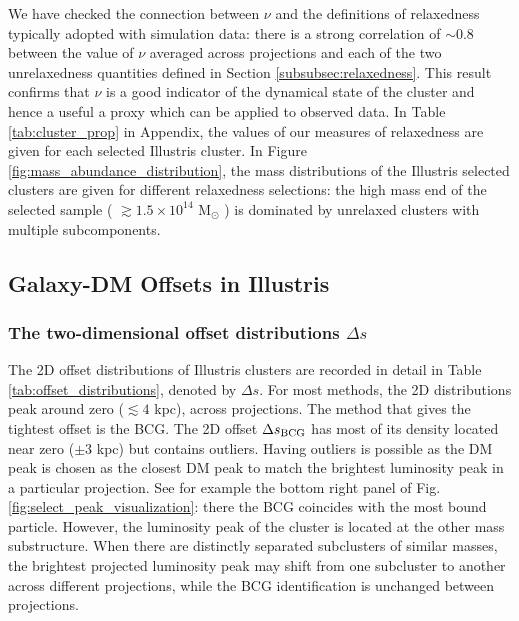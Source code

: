 \documentclass[usenatbib]{mn2e}
\begin{document}
{We have checked the connection between $\nu$ and the definitions of relaxedness typically adopted with simulation data: there is a strong correlation of $\sim 0.8$ between the value of $\nu$ averaged across projections and
each of the two unrelaxedness quantities defined in Section \ref{subsubsec:relaxedness}. This result confirms that $\nu$ is a good indicator of the dynamical state of the cluster and hence a useful a proxy which can be applied to observed data.
In Table \ref{tab:cluster_prop} in Appendix, the values of our measures of relaxedness are given for each selected Illustris cluster. In Figure \ref{fig:mass_abundance_distribution}, the mass distributions of the Illustris selected clusters are given for different relaxedness selections: the high mass end of the selected sample ( $ \gtrsim 1.5 \times 10^{14}$ M$_\odot$ ) is dominated by unrelaxed clusters with multiple subcomponents.



\subsection{Galaxy-DM Offsets in Illustris}
\label{subsec:galaxyDMoffset}

\subsubsection{The two-dimensional offset distributions $\Delta s$}

The 2D offset distributions of Illustris clusters are recorded in detail in Table
\ref{tab:offset_distributions}, denoted by $\Delta s$.
For most methods, the 2D distributions peak around zero ($\lesssim 4$ kpc), across projections.
The method that gives the tightest offset is the BCG. 
The 2D offset $\Delta s_{\rm BCG}$ has most of its density located near zero
($\pm 3$ kpc) but contains outliers. Having outliers is possible 
as the DM peak is chosen as the closest DM peak to match the
brightest luminosity peak in a particular projection. See for example the bottom right panel of Fig. \ref{fig:select_peak_visualization}: there the BCG 
coincides with the most bound particle. However, the luminosity peak of the
cluster is located at the other mass substructure.
When there are distinctly separated subclusters of similar masses, 
the brightest projected luminosity peak may shift from one subcluster to another across different projections,
while the BCG identification is unchanged between projections.

}
\end{document}
